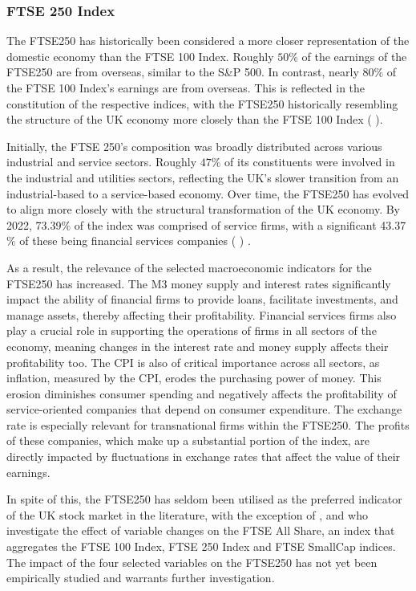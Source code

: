 \documentclass[11pt,a4paper]{article}
\newcommand{\citeboth}[1]{\citeauthor{#1} \citep{#1}}
\begin{document}
\subsubsection{FTSE 250 Index}

The FTSE250 has historically been considered a more closer representation of the domestic economy than the FTSE 100 Index. Roughly $50\%$ of the earnings of the FTSE250 are from overseas, similar to the S\&P 500. In contrast, nearly $80\%$ of the FTSE 100 Index's earnings are from overseas. 
This is reflected in the constitution of the respective indices, with the 
FTSE250 historically resembling the structure of the UK economy more closely than the FTSE 100 Index (\citeboth{ftse250history}).

Initially, the FTSE 250's composition was broadly distributed across 
various industrial and service sectors. Roughly $47\%$ of its constituents 
were involved in the industrial and utilities sectors, reflecting the UK's 
slower transition from an industrial-based to a service-based economy. 
Over time, the FTSE250 has evolved to align more closely with the 
structural transformation of the UK economy. 
By 2022, 73.39$\%$ of the index was comprised of service firms, 
with a significant 43.37$\%$ of these being financial services companies (\citeboth{ftse250history}) .

As a result, the relevance of the selected macroeconomic indicators for the FTSE250 
has increased. The M3 money supply and interest rates significantly 
impact the ability of financial firms 
to provide loans, facilitate investments, and manage assets, thereby affecting their profitability. 
Financial services firms also play a crucial role in supporting the 
operations of firms in all sectors of the economy, meaning 
changes in the interest rate and money supply affects their profitability too. 
The CPI is also of critical importance across all sectors, 
as inflation, measured by the CPI, erodes the purchasing power of money. 
This erosion diminishes consumer spending and negatively affects the 
profitability of service-oriented companies that depend on consumer 
expenditure. The exchange rate is especially relevant for transnational 
firms within the FTSE250. The profits of these companies, which make up a substantial 
portion of the index, are directly impacted by fluctuations in exchange 
rates that affect the value of their earnings.

In spite of this, the FTSE250 has seldom been utilised as the preferred indicator of the UK stock market in the literature,
with the exception of \citeboth{smit2023longrun}, \citeboth{khatri2024impact} and \citeboth{engstrom2006impact} who investigate the effect of variable changes on the FTSE All Share, an index that aggregates the 
FTSE 100 Index, FTSE 250 Index and FTSE SmallCap indices. The impact of the four selected variables on the FTSE250 has not yet been empirically studied and 
warrants further investigation.
\end{document}
